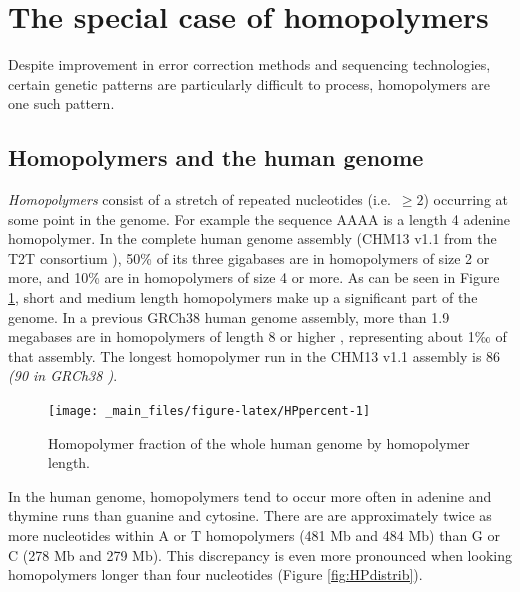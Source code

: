 \documentclass[
  11pt,
  twoside]{scrbook}
\begin{document}
\hypertarget{the-special-case-of-homopolymers}{%
\section{The special case of homopolymers}\label{the-special-case-of-homopolymers}}

Despite improvement in error correction methods and sequencing technologies, certain genetic patterns are particularly difficult to process, homopolymers are one such pattern.

\hypertarget{homopolymers-and-the-human-genome}{%
\subsection{Homopolymers and the human genome}\label{homopolymers-and-the-human-genome}}

\emph{Homopolymers} consist of a stretch of repeated nucleotides (i.e.~\(\geq 2\)) occurring at some point in the genome. For example the sequence AAAA is a length 4 adenine homopolymer. In the complete human genome assembly (CHM13 v1.1 from the T2T consortium \autocite{nurk2022}), 50\% of its three gigabases are in homopolymers of size 2 or more, and 10\% are in homopolymers of size 4 or more. As can be seen in Figure \ref{fig:HPpercent}, short and medium length homopolymers make up a significant part of the genome. In a previous GRCh38 human genome assembly, more than 1.9 megabases are in homopolymers of length 8 or higher \autocite{booeshaghiPseudoalignmentFacilitatesAssignment2022}, representing about 1‰ of that assembly. The longest homopolymer run in the CHM13 v1.1 assembly is 86 \emph{(90 in GRCh38 \autocite{booeshaghiPseudoalignmentFacilitatesAssignment2022})}.

\begin{figure}

{\centering \texttt{[image: \_main\_files/figure-latex/HPpercent-1]} 

}

\caption{Homopolymer fraction of the whole human genome by homopolymer length.}\label{fig:HPpercent}
\end{figure}

In the human genome, homopolymers tend to occur more often in adenine and thymine runs than guanine and cytosine. There are are approximately twice as more nucleotides within A or T homopolymers (481 Mb and 484 Mb) than G or C (278 Mb and 279 Mb). This discrepancy is even more pronounced when looking homopolymers longer than four nucleotides (Figure \ref{fig:HPdistrib}).
\end{document}

